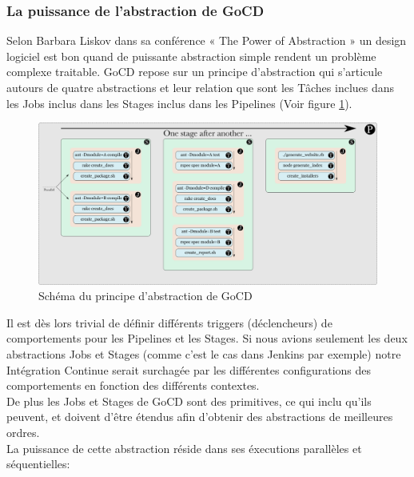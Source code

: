     \subsubsection{La puissance de l'abstraction de GoCD}
    Selon Barbara Liskov dans sa conférence « The Power of Abstraction » \cite{Lis09} un design logiciel est bon quand de puissante abstraction simple rendent un problème complexe traitable. GoCD repose sur un principe d'abstraction qui s'articule autours de quatre abstractions et leur relation que sont les Tâches inclues dans les Jobs inclus dans les Stages inclus dans les Pipelines (Voir figure \ref{Pipeline}).\\

    \begin{figure}
      \begin{center}
        \includegraphics[scale=0.7]{images/pipeline.png}
      \end{center}
      \caption{Schéma du principe d'abstraction de GoCD}
      \label{Pipeline}
    \end{figure}

    Il est dès lors trivial de définir différents triggers (déclencheurs) de comportements pour les Pipelines et les Stages. Si nous avions seulement les deux abstractions Jobs et Stages (comme c'est le cas dans Jenkins par exemple) notre Intégration Continue serait surchagée par les différentes configurations des comportements en fonction des différents contextes.\\

    De plus les Jobs et Stages de GoCD sont des primitives, ce qui inclu qu'ils peuvent, et doivent d'être étendus afin d'obtenir des abstractions de meilleures ordres.\\

    La puissance de cette abstraction réside dans ses éxecutions parallèles et séquentielles:\\

